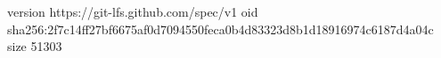 version https://git-lfs.github.com/spec/v1
oid sha256:2f7c14ff27bf6675af0d7094550feca0b4d83323d8b1d18916974c6187d4a04c
size 51303
